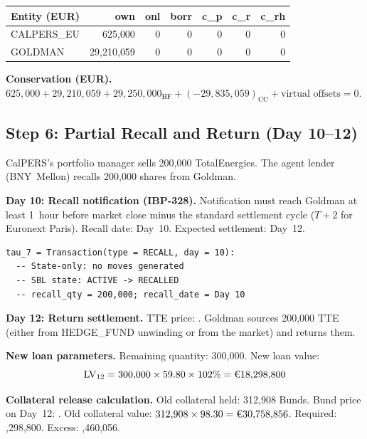 \documentclass[11pt,a4paper]{article}
\newcommand{\EUR}[1]{\texteuro#1}
\begin{document}
\begin{center}\small
\begin{tabular}{l r r r r r r}
\toprule
\textbf{Entity (EUR)} & own & onl & borr & c\_p & c\_r & c\_rh \\
\midrule
CALPERS\_EU & 625{,}000 & 0 & 0 & 0 & 0 & 0 \\
GOLDMAN & 29{,}210{,}059 & 0 & 0 & 0 & 0 & 0 \\
\bottomrule
\end{tabular}
\end{center}

\noindent\textbf{Conservation (EUR).} $625{,}000 + 29{,}210{,}059 + 29{,}250{,}000_{\text{HF}} + (-29{,}835{,}059)_{\text{CC}} + \text{virtual offsets} = 0$. \checkmark

\subsection{Step 6: Partial Recall and Return (Day 10--12)}
\label{sec:eu-step6}

CalPERS's portfolio manager sells 200{,}000 TotalEnergies. The agent lender (BNY~Mellon) recalls 200{,}000 shares from Goldman.

\medskip
\noindent\textbf{Day 10: Recall notification (IBP-328).} Notification must reach Goldman at least 1~hour before market close minus the standard settlement cycle ($T+2$ for Euronext Paris). Recall date: Day~10. Expected settlement: Day~12.

\begin{lstlisting}
tau_7 = Transaction(type = RECALL, day = 10):
  -- State-only: no moves generated
  -- SBL state: ACTIVE -> RECALLED
  -- recall_qty = 200,000; recall_date = Day 10
\end{lstlisting}

\medskip
\noindent\textbf{Day 12: Return settlement.} TTE price: \EUR{59.80}. Goldman sources 200{,}000 TTE (either from HEDGE\_FUND unwinding or from the market) and returns them.

\medskip
\noindent\textbf{New loan parameters.} Remaining quantity: 300{,}000. New loan value:
\[
\mathrm{LV}_{12} = 300{,}000 \times 59.80 \times 102\% = \text{\EUR{18,298,800}}
\]

\noindent\textbf{Collateral release calculation.} Old collateral held: 312{,}908 Bunds. Bund price on Day~12: \EUR{98.30}. Old collateral value: $312{,}908 \times 98.30 = \text{\EUR{30,758,856}}$. Required: \EUR{18,298,800}. Excess: \EUR{12,460,056}.
\end{document}
